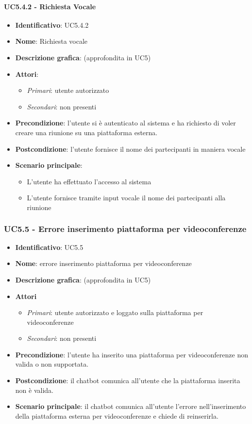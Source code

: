 \paragraph{UC5.4.2 - Richiesta Vocale}
\begin{itemize}
   \item \textbf{Identificativo}: UC5.4.2
   \item \textbf{Nome}: Richiesta vocale
   \item \textbf{Descrizione grafica}: (approfondita in UC5)
   \item \textbf{Attori}:
   \begin{itemize} 
       \item \textit{Primari}: utente autorizzato
       \item \textit{Secondari}: non presenti
   \end{itemize}
       \item \textbf{Precondizione}: l'utente si è autenticato al sistema e ha richiesto di voler creare una riunione su una piattaforma esterna.
       \item \textbf{Postcondizione}: l'utente fornisce il nome dei partecipanti in maniera vocale
    \item \textbf{Scenario principale}: 
       \begin{itemize}
           \item L'utente ha effettuato l'accesso al sistema 
           \item L'utente fornisce tramite input vocale il nome dei partecipanti alla riunione
       \end{itemize}
\end{itemize}

\subsubsection{UC5.5 - Errore inserimento piattaforma per videoconferenze}
\begin{itemize}
    \item \textbf{Identificativo}: UC5.5
    \item \textbf{Nome}: errore inserimento piattaforma per videoconferenze
    \item \textbf{Descrizione grafica}: (approfondita in UC5)
    \item \textbf{Attori}
 \begin{itemize} 
    \item \textit{Primari}: utente autorizzato e loggato sulla piattaforma per videoconferenze
    \item \textit{Secondari}: non presenti
 \end{itemize}
 \item \textbf{Precondizione}: l'utente ha inserito una piattaforma per videoconferenze non valida o non supportata.
 \item \textbf{Postcondizione}: il chatbot comunica all'utente che la piattaforma inserita non è valida.
 \item \textbf{Scenario principale}: il chatbot comunica all'utente l'errore nell'inserimento della piattaforma esterna per videoconferenze e chiede di reinserirla.
\end{itemize}
